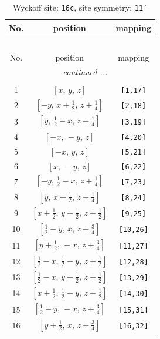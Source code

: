 \documentclass[fleqn,8pt]{jsarticle}
\begin{document}
\begin{longtable}{ccc}
\caption{Wyckoff site: {\tt 16c}, site symmetry: {\tt 11'}}
 \\
 \hline \hline
No. & position & mapping \\ \hline \endfirsthead

\multicolumn{2}{l}{\tablename\ \thetable{}} \\
 \hline \hline
No. & position & mapping \\ \hline \endhead

 \hline \hline
\multicolumn{2}{r}{\footnotesize\it continued ...} \\ \endfoot

 \hline \hline
\multicolumn{2}{r}{} \\ \endlastfoot

1 & $\left[ x,\, y,\, z \right]$ & {\tt [1,17]} \\ \hline
2 & $\left[ - y,\, x + \frac{1}{2},\, z + \frac{1}{4} \right]$ & {\tt [2,18]} \\ \hline
3 & $\left[ y,\, \frac{1}{2} - x,\, z + \frac{1}{4} \right]$ & {\tt [3,19]} \\ \hline
4 & $\left[ - x,\, - y,\, z \right]$ & {\tt [4,20]} \\ \hline
5 & $\left[ - x,\, y,\, z \right]$ & {\tt [5,21]} \\ \hline
6 & $\left[ x,\, - y,\, z \right]$ & {\tt [6,22]} \\ \hline
7 & $\left[ - y,\, \frac{1}{2} - x,\, z + \frac{1}{4} \right]$ & {\tt [7,23]} \\ \hline
8 & $\left[ y,\, x + \frac{1}{2},\, z + \frac{1}{4} \right]$ & {\tt [8,24]} \\ \hline
9 & $\left[ x + \frac{1}{2},\, y + \frac{1}{2},\, z + \frac{1}{2} \right]$ & {\tt [9,25]} \\ \hline
10 & $\left[ \frac{1}{2} - y,\, x,\, z + \frac{3}{4} \right]$ & {\tt [10,26]} \\ \hline
11 & $\left[ y + \frac{1}{2},\, - x,\, z + \frac{3}{4} \right]$ & {\tt [11,27]} \\ \hline
12 & $\left[ \frac{1}{2} - x,\, \frac{1}{2} - y,\, z + \frac{1}{2} \right]$ & {\tt [12,28]} \\ \hline
13 & $\left[ \frac{1}{2} - x,\, y + \frac{1}{2},\, z + \frac{1}{2} \right]$ & {\tt [13,29]} \\ \hline
14 & $\left[ x + \frac{1}{2},\, \frac{1}{2} - y,\, z + \frac{1}{2} \right]$ & {\tt [14,30]} \\ \hline
15 & $\left[ \frac{1}{2} - y,\, - x,\, z + \frac{3}{4} \right]$ & {\tt [15,31]} \\ \hline
16 & $\left[ y + \frac{1}{2},\, x,\, z + \frac{3}{4} \right]$ & {\tt [16,32]} \\
\end{longtable}
\end{document}
